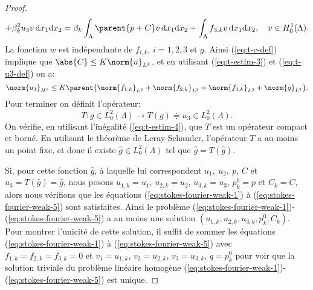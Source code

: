 \begin{proof}
\begin{equation}
{                            + \beta_k^2 u_3 v}\,\mathrm dx_1\mathrm dx_2 %
    = \beta_k\int_\Lambda \parent{p + C}v \,\mathrm dx_1\mathrm dx_2 %
    + \int_\Lambda f_{3,k}v\,\mathrm dx_1\mathrm dx_2, %
    \quad v\in H_0^1(\Lambda).
  \end{equation}
  La fonction $w$ est indépendante de $f_{i,k}$, $i = 1,2,3$ et
  $g$. Ainsi (\ref{eq:t-c-def}) implique que $\abs{C}\leq
  K\norm{u}_{L^2}$, et en utilisant (\ref{eq:t-estim-3}) et
  (\ref{eq:t-u3-def}) on a:
  \begin{equation}\label{eq:t-estim-4}
    \norm{u_3}_{H^1} %
    \leq K\parent{\norm{f_{1,k}}_{L^2} %
      + \norm{f_{2,k}}_{L^2} %
      + \norm{f_{3,k}}_{L^2} %
      + \norm{g}_{L^2}}.
  \end{equation}
  Pour terminer on définit l'opérateur:
  \begin{equation}
    T: g\in L_0^2(\Lambda)\to T(g)\doteqdot u_3\in L_0^2(\Lambda).
  \end{equation}
  On vérifie, en utilisant l'inégalité (\ref{eq:t-estim-4}), que
  $T$ est un opérateur compact et borné. En utilisant le
  théorème de Leray-Schauder, l'opérateur $T$ a au moins un
  point fixe, et donc il existe $\hat g\in L_0^2(\Lambda)$ tel que
  $\hat g = T(\hat g)$.

  Si, pour cette fonction $\hat g$, à laquelle lui correspondent
  $u_1,\ u_2,\ p$, $C$ et $u_3 = T(\hat g) = \hat g$, nous posons
  $u_{1,k} = u_1$, $u_{2,k} = u_2$, $u_{3,k} = u_3$, $p_k^0 = p$ et
  $C_k = C$,
  alors nous vérifions que les équations
  (\ref{eq:stokes-fourier-weak-1}) à
  (\ref{eq:stokes-fourier-weak-5}) sont satisfaites. Ainsi le
  problème
  (\ref{eq:stokes-fourier-weak-1})-(\ref{eq:stokes-fourier-weak-5}) a
  au moins une solution $(u_{1,k},u_{2,k},u_{3,k},p_k^0,C_k)$.  Pour
  montrer l'unicité de cette solution, il suffit de sommer les
  équations (\ref{eq:stokes-fourier-weak-1}) à
  (\ref{eq:stokes-fourier-weak-5}) avec $f_{1,k} = f_{2,k} = f_{3,k} =
  0$ et $v_1 = u_{1,k}$, $v_2 = u_{2,k}$, $v_3 = u_{3,k}$, $q =
  p_{k}^0$ pour voir que la solution triviale du problème linéaire
  homogène
  (\ref{eq:stokes-fourier-weak-1})-(\ref{eq:stokes-fourier-weak-5})
  est unique.
\end{proof}
